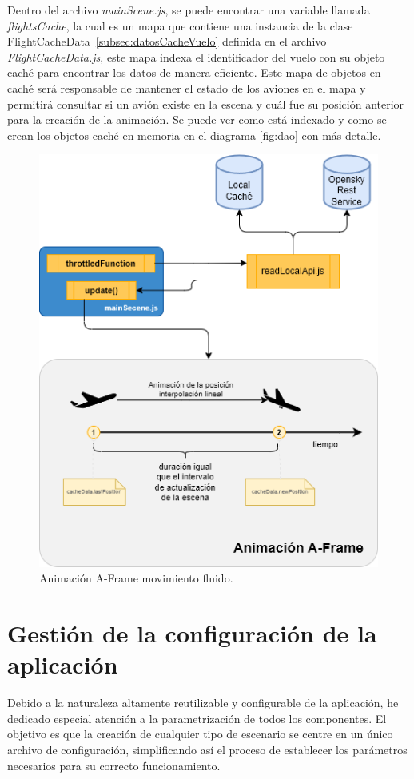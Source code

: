 \documentclass[a4paper, 11pt]{book}
\begin{document}
Dentro del archivo \emph{mainScene.js}, se puede encontrar una variable llamada \emph{flightsCache}, la cual es un mapa que contiene una instancia de la clase FlightCacheData~\ref{subsec:datosCacheVuelo} definida en el archivo \emph{FlightCacheData.js}, este mapa indexa el identificador del vuelo con su objeto caché para encontrar los datos de manera eficiente. Este mapa de objetos en caché será responsable de mantener el estado de los aviones en el mapa y permitirá consultar si un avión existe en la escena y cuál fue su posición anterior para la creación de la animación.
Se puede ver como está indexado y como se crean los objetos caché en memoria en el diagrama \ref{fig:dao} con más detalle.
\begin{figure}[h]
	\centering
	\includegraphics[width=12cm, keepaspectratio]{img/movimientoFluido.drawio.png}
	\caption{Animación A-Frame movimiento fluido.}
	\label{fig:movimientoFluido}
\end{figure}


\clearpage
\section{Gestión de la configuración de la aplicación}
\label{sec:configuration}
Debido a la naturaleza altamente reutilizable y configurable de la aplicación, he dedicado especial atención a la parametrización de todos los componentes. El objetivo es que la creación de cualquier tipo de escenario se centre en un único archivo de configuración, simplificando así el proceso de establecer los parámetros necesarios para su correcto funcionamiento.
\end{document}
